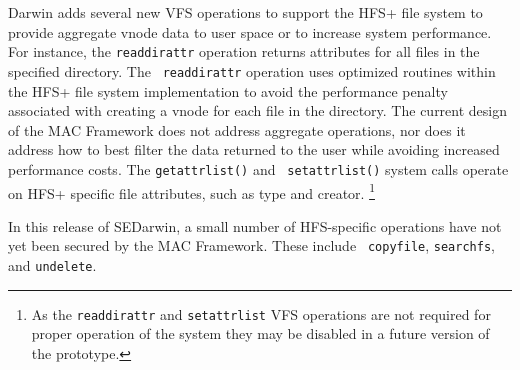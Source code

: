 Darwin adds several new VFS operations to support the HFS+ file system
to provide aggregate vnode data to user space or to increase system
performance.  For instance, the {\tt readdirattr} operation returns
attributes for all files in the specified directory.  The {\tt
readdirattr} operation uses optimized routines within the HFS+ file
system implementation to avoid the performance penalty associated with
creating a vnode for each file in the directory.  The current design
of the MAC Framework does not address aggregate operations, nor does
it address how to best filter the data returned to the user while
avoiding increased performance costs.  The {\tt getattrlist()} and {\tt
setattrlist()} system calls operate on HFS+ specific file attributes,
such as type and creator.
\footnote{As the {\tt readdirattr} and {\tt setattrlist} VFS operations
are not required for proper operation of the system they may be
disabled in a future version of the prototype.}

In this release of SEDarwin, a small number of HFS-specific operations
have not yet been secured by the MAC Framework.  These include {\tt
copyfile}, {\tt searchfs}, and {\tt undelete}.
